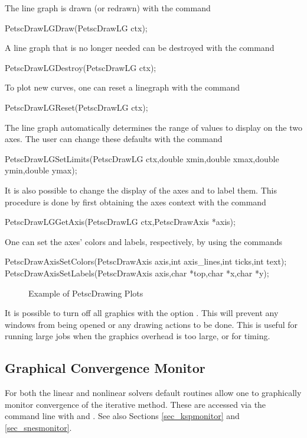 {{{The line graph is drawn (or redrawn) with the command 
\begin{tabbing}
  PetscDrawLGDraw(PetscDrawLG ctx);
\end{tabbing}
A line graph that is no longer needed can be destroyed with the 
command 
\begin{tabbing}
  PetscDrawLGDestroy(PetscDrawLG ctx);
\end{tabbing}
To plot new curves, one can reset a linegraph with the
command 
\begin{tabbing}
  PetscDrawLGReset(PetscDrawLG ctx);
\end{tabbing}
The line graph automatically determines the range of values to 
display on the two axes.  The user can change these defaults with the 
command 
\begin{tabbing}
  PetscDrawLGSetLimits(PetscDrawLG ctx,double xmin,double xmax,double ymin,double ymax);
\end{tabbing}

It is also possible to change the display of the axes and to label
them. This procedure is done by first obtaining the axes context with the 
command  
\begin{tabbing}
  PetscDrawLGGetAxis(PetscDrawLG ctx,PetscDrawAxis *axis);
\end{tabbing}
One can set the axes' colors and labels, respectively, by using the
commands 
\begin{tabbing}
  PetscDrawAxisSetColors(PetscDrawAxis axis,int axis\_lines,int ticks,int text);\\
  PetscDrawAxisSetLabels(PetscDrawAxis axis,char *top,char *x,char *y);
\end{tabbing}

\begin{figure}[H]
{\small
{}
}
\caption{Example of PetscDrawing Plots}
\label{fig_plot}
\end{figure}

It is possible to turn off all graphics with the option 
. This
will prevent any windows from being opened or any drawing actions to be done.
This is useful for running large jobs when the graphics overhead is too
large, or for timing.

\subsection{Graphical Convergence Monitor}
For both the linear and nonlinear solvers default routines
allow one to graphically monitor convergence of the iterative method.
These are accessed via the command line with 
 and . 
 See also Sections \ref{sec_kspmonitor} and
\ref{sec_snesmonitor}. 

}}}
